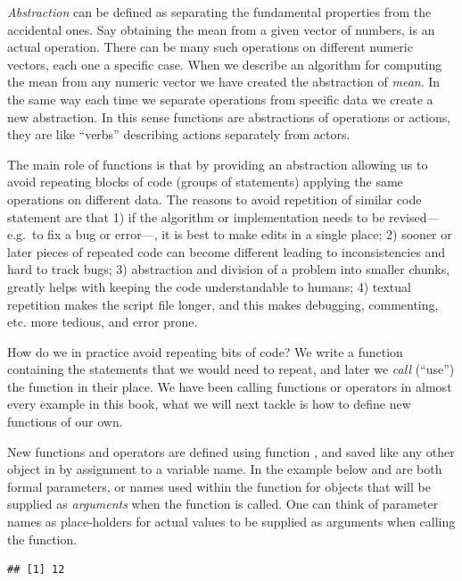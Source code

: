 \documentclass[krantz2]{krantz}\usepackage{knitr}%
\begin{document}
\emph{Abstraction} can be defined as separating the fundamental properties from the accidental ones. Say obtaining the mean from a given vector of numbers, is an actual operation. There can be many such operations on different numeric vectors, each one a specific case. When we describe an algorithm for computing the mean from any numeric vector we have created the abstraction of \emph{mean}. In the same way each time we separate operations from specific data we create a new abstraction. In this sense functions are abstractions of operations or actions, they are like ``verbs'' describing actions separately from actors.

The main role of functions is that by providing an abstraction allowing us to avoid repeating blocks of code (groups of statements) applying the same operations on different data. The reasons to avoid repetition of similar code statement are that 1) if the algorithm or implementation needs to be revised---e.g.\ to fix a bug or error---, it is best to make edits in a single place; 2) sooner or later pieces of repeated code can become different leading to inconsistencies and hard to track bugs; 3) abstraction and division of a problem into smaller chunks, greatly helps with keeping the code understandable to humans; 4) textual repetition makes the script file longer, and this makes debugging, commenting, etc. more tedious, and error prone.

How do we in practice avoid repeating bits of code? We write a function containing the statements that we would need to repeat, and later we \emph{call} (``use'') the function in their place. We have been calling \Rlang functions or operators in almost every example in this book, what we will next tackle is how to define new functions of our own.

New functions and operators are defined using function , and saved like any other object in \Rpgrm by assignment to a variable name. In the example below  and  are both formal parameters, or names used within the function for objects that will be supplied as \emph{arguments} when the function is called. One can think of parameter names as place-holders for actual values to be supplied as arguments when calling the function.

\begin{knitrout}\footnotesize
{}\color{fgcolor}\begin{kframe}
\begin{alltt}
 \hlkwb{<-} \hlstd{(}\hlstd{,}  \hlopt{*} 
\hlstd{(}\hlstd{,} \hlstd{)}
\end{alltt}
\begin{verbatim}
## [1] 12
\end{verbatim}
\end{kframe}
\end{knitrout}
\end{document}
